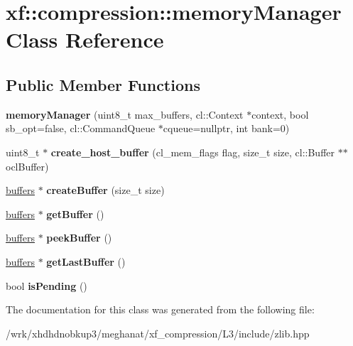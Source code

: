 \hypertarget{classxf_1_1compression_1_1memoryManager}{\section{xf\-:\-:compression\-:\-:memory\-Manager Class Reference}
\label{classxf_1_1compression_1_1memoryManager}
}
\subsection*{Public Member Functions}
\begin{DoxyCompactItemize}
\item 
\hypertarget{classxf_1_1compression_1_1memoryManager_a7dbe2116b13a6585e857333d3236dbaa}{{\bfseries memory\-Manager} (uint8\-\_\-t max\-\_\-buffers, cl\-::\-Context $\ast$context, bool sb\-\_\-opt=false, cl\-::\-Command\-Queue $\ast$cqueue=nullptr, int bank=0)}\label{classxf_1_1compression_1_1memoryManager_a7dbe2116b13a6585e857333d3236dbaa}

\item 
\hypertarget{classxf_1_1compression_1_1memoryManager_a7b4e6c8d1559bad53004de3aa1374f97}{uint8\-\_\-t $\ast$ {\bfseries create\-\_\-host\-\_\-buffer} (cl\-\_\-mem\-\_\-flags flag, size\-\_\-t size, cl\-::\-Buffer $\ast$$\ast$ocl\-Buffer)}\label{classxf_1_1compression_1_1memoryManager_a7b4e6c8d1559bad53004de3aa1374f97}

\item 
\hypertarget{classxf_1_1compression_1_1memoryManager_a41ec4b8844024a9681b5b2169d409498}{\hyperlink{structxf_1_1compression_1_1buffers}{buffers} $\ast$ {\bfseries create\-Buffer} (size\-\_\-t size)}\label{classxf_1_1compression_1_1memoryManager_a41ec4b8844024a9681b5b2169d409498}

\item 
\hypertarget{classxf_1_1compression_1_1memoryManager_aa556e1b841b4c2caf857dcca3cf61e2b}{\hyperlink{structxf_1_1compression_1_1buffers}{buffers} $\ast$ {\bfseries get\-Buffer} ()}\label{classxf_1_1compression_1_1memoryManager_aa556e1b841b4c2caf857dcca3cf61e2b}

\item 
\hypertarget{classxf_1_1compression_1_1memoryManager_ad6c764d30b210653e405ec3e1922ccdc}{\hyperlink{structxf_1_1compression_1_1buffers}{buffers} $\ast$ {\bfseries peek\-Buffer} ()}\label{classxf_1_1compression_1_1memoryManager_ad6c764d30b210653e405ec3e1922ccdc}

\item 
\hypertarget{classxf_1_1compression_1_1memoryManager_a4f063f42fc29f958f793b68e197afe59}{\hyperlink{structxf_1_1compression_1_1buffers}{buffers} $\ast$ {\bfseries get\-Last\-Buffer} ()}\label{classxf_1_1compression_1_1memoryManager_a4f063f42fc29f958f793b68e197afe59}

\item 
\hypertarget{classxf_1_1compression_1_1memoryManager_a5dc666affd08f2316ebb6bf5033c647d}{bool {\bfseries is\-Pending} ()}\label{classxf_1_1compression_1_1memoryManager_a5dc666affd08f2316ebb6bf5033c647d}

\end{DoxyCompactItemize}


The documentation for this class was generated from the following file\-:\begin{DoxyCompactItemize}
\item 
/wrk/xhdhdnobkup3/meghanat/xf\-\_\-compression/\-L3/include/zlib.\-hpp\end{DoxyCompactItemize}

